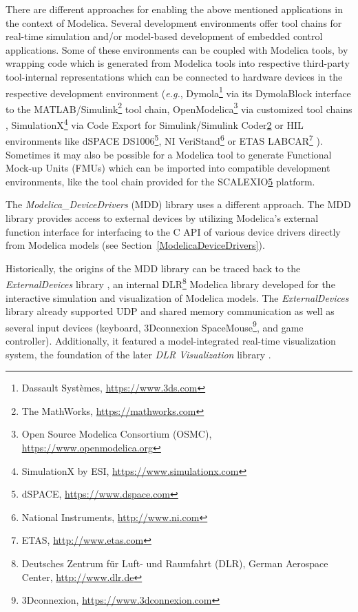 \documentclass{resources/modelica}
\begin{document}
There are different approaches for enabling the above mentioned applications in
the context of Modelica. Several development environments offer tool chains for
real-time simulation and/or model-based development of embedded control
applications.
Some of these environments can be coupled with Modelica tools, by wrapping code
which is generated from Modelica tools into respective third-party tool-internal
representations which can be connected to hardware devices in the respective
development environment (\textit{e.g.}, Dymola\footnote{Dassault Systèmes,
\url{https://www.3ds.com}} via its DymolaBlock interface to the
MATLAB/Simulink\footnote{\label{tmw}The MathWorks, \url{https://mathworks.com}}
tool chain, OpenModelica\footnote{Open Source Modelica Consortium (OSMC),
\url{https://www.openmodelica.org}} via customized tool chains
\citep{Worschech2012}, SimulationX\footnote{SimulationX by ESI,
\url{https://www.simulationx.com}} via Code Export for Simulink/Simulink
Coder\cref{tmw} or HIL environments like dSPACE
DS1006\footnote{\label{dspace}dSPACE, \url{https://www.dspace.com}}, NI
VeriStand\footnote{National Instruments, \url{http://www.ni.com}} or ETAS
LABCAR\footnote{ETAS, \url{http://www.etas.com}} \citep{Blochwitz2009}).
Sometimes it may also be possible for a Modelica tool to generate Functional
Mock-up Units (FMUs) which can be imported into compatible development
environments, like the tool chain provided for the SCALEXIO\cref{dspace}
platform.

The \emph{Modelica\_DeviceDrivers} (MDD) library uses a different approach.
The MDD library provides access to external devices by utilizing Modelica's external
function interface for interfacing to the C API of various device drivers directly from Modelica
models (see Section~\ref{ModelicaDeviceDrivers}).

Historically, the origins of the MDD library can be traced back to the
\emph{ExternalDevices} library \citep{Bellmann2009}, an internal
DLR\footnote{Deutsches Zentrum für Luft- und Raumfahrt (DLR), German Aerospace
Center, \url{http://www.dlr.de}} Modelica library developed for the interactive
simulation and visualization of Modelica models. The \emph{ExternalDevices}
library already supported UDP and shared memory communication
as well as several input devices (keyboard, 3Dconnexion
SpaceMouse\footnote{3Dconnexion, \url{https://www.3dconnexion.com}}, and game
controller). Additionally, it featured a model-integrated real-time
visualization system, the foundation of the later \emph{DLR Visualization} library \citep{Hellerer2014}.
\end{document}
